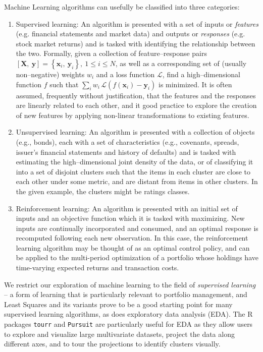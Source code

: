 \documentclass[graybox,envcountchap,sectrefs]{svmono}\usepackage[]{graphicx}\usepackage[]{xcolor}
\begin{document}
\begin{appendices}
Machine Learning algorithms can usefully be classified into three
categories:
\begin{enumerate}
\item Supervised learning: An algorithm is presented with a set of inputs
or \emph{features} (e.g. financial statements and market data) and
outputs or \emph{responses} (e.g. stock market returns) and is tasked
with identifying the relationship between the two. Formally, given
a collection of feature--response pairs $\left[\mathbf{X},\ \mathbf{y}\right]=\left\{ \mathbf{x}_{i},\ \mathbf{y}_{i}\right\} ,\ 1\leqslant i\leqslant N$,
as well as a corresponding set of (usually non--negative) weights
$w_{i}$ and a loss function $\mathscr{L}$, find a high--dimensional
function $f$ such that $\sum_{i}w_{i}\,\mathscr{L}\left(f\left(\mathbf{x}_{i}\right)-\mathbf{y}_{i}\right)$
is minimized. It is often assumed, frequently without justification,
that the features and the responses are linearly related to each other,
and it good practice to explore the creation of new features by applying
non-linear transformations to existing features. 
\item Unsupervised learning: An algorithm is presented with a collection
of objects (e.g., bonds), each with a set of characteristics (e.g.,
covenants, spreads, issuer's financial statements and history of defaults)
and is tasked with estimating the high--dimensional joint density
of the data, or of classifying it into a set of disjoint clusters
such that the items in each cluster are close to each other under
some metric, and are distant from items in other clusters. In the
given example, the clusters might be ratings classes. 
\item Reinforcement learning: An algorithm is presented with an initial
set of inputs and an objective function which it is tasked with maximizing.
New inputs are continually incorporated and consumed, and an optimal
response is recomputed following each new observation. In this case,
the reinforcement learning algorithm may be thought of as an optimal
control policy, and can be applied to the multi-period optimization
of a portfolio whose holdings have time-varying expected returns and
transaction costs.
\end{enumerate}

We restrict our exploration of machine learning to the field of \emph{supervised
learning} -- a form of learning that is particularly relevant to
portfolio management, and Least Squares and its variants prove to
be a good starting point for many supervised learning algorithms,
as does exploratory data analysis (EDA). The R packages \texttt{tourr}
and \texttt{Pursuit} are particularly useful for EDA as they allow
users to explore and visualize large multivariate datasets, project
the data along different axes, and to tour the projections to identify
clusters visually.



\end{appendices}
\end{document}
